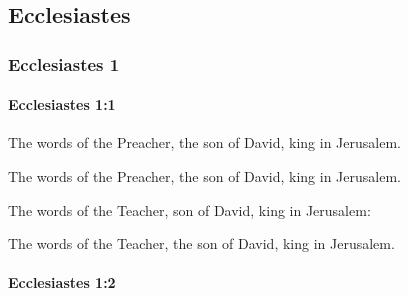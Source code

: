 \subsection{Ecclesiastes}
	\label{ECCLESIASTES}

	\subsubsection{Ecclesiastes 1} %
		\label{ECCLESIASTES-1}

		\paragraph{Ecclesiastes 1:1} %
			\label{ECCLESIASTES-1-1}

			The words of the Preacher, the son of David, king in Jerusalem.

			\begin{versebox}
					\item[BHS] 
					\item[LXX] 
					\item[ASV] The words of the Preacher, the son of David, king in Jerusalem.
					\item[NIV] The words of the Teacher, son of David, king in Jerusalem:
					\item[NRSV] The words of the Teacher, the son of David, king in Jerusalem.
			\end{versebox}

		\paragraph{Ecclesiastes 1:2} %
			\label{ECCLESIASTES-1-2}

